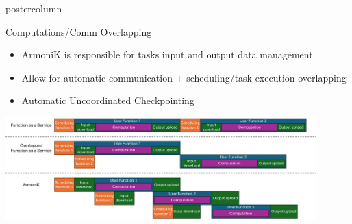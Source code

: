 \begin{frame}[fragile]
  \begin{columns}[T]
    \begin{column}{.49\textwidth}
      \begin{beamercolorbox}[center,wd=\textwidth]{postercolumn}
        \begin{minipage}[T]{.96\textwidth}

            \begin{block}{Computations/Comm Overlapping}
                \begin{itemize}
                \item ArmoniK is responsible for tasks input and output data management
                \item Allow for automatic communication + scheduling/task execution overlapping
                \item Automatic Uncoordinated Checkpointing
                \end{itemize}
                \vspace{2ex}
                \centering
                \includegraphics[width=0.9\textwidth]{pipelining_compare.png}
            \end{block}


\end{minipage}
\end{beamercolorbox}
\end{column}
\end{columns}
\end{frame}
